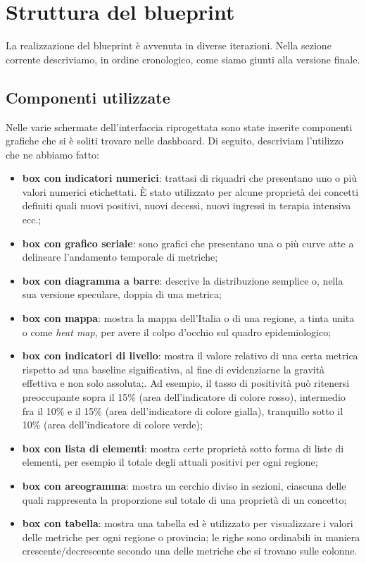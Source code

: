 \section{Struttura del blueprint}\label{s:struttura-blueprint}
La realizzazione del blueprint è avvenuta in diverse iterazioni. Nella sezione corrente descriviamo, in ordine cronologico, come siamo giunti alla versione finale.

\subsection{Componenti utilizzate}\label{ss:componenti-utilizzate}
Nelle varie schermate dell'interfaccia riprogettata sono state inserite componenti grafiche che si è soliti trovare nelle dashboard. Di seguito, descriviam l'utilizzo che ne abbiamo fatto:
\begin{itemize}
    \item \textbf{box con indicatori numerici}: trattasi di riquadri che presentano uno o più valori numerici etichettati. È stato utilizzato per alcune proprietà dei concetti definiti quali nuovi positivi, nuovi decessi, nuovi ingressi in terapia intensiva ecc.;
    \item \textbf{box con grafico seriale}: sono grafici che presentano una o più curve atte a delineare l'andamento temporale di metriche;
    \item \textbf{box con diagramma a barre}: descrive la distribuzione semplice o, nella sua versione speculare, doppia di una metrica;
    \item \textbf{box con mappa}: mostra la mappa dell'Italia o di una regione, a tinta unita o come \textit{heat map}, per avere il colpo d'occhio sul quadro epidemiologico;
    \item \textbf{box con indicatori di livello}: mostra il valore relativo di una certa metrica rispetto ad una baseline significativa, al fine di evidenziarne la gravità effettiva e non solo assoluta;. Ad esempio, il tasso di positività può ritenersi preoccupante sopra il 15\% (area dell'indicatore di colore rosso), intermedio fra il 10\% e il 15\% (area dell'indicatore di colore gialla), tranquillo sotto il 10\% (area dell'indicatore di colore verde);
    \item \textbf{box con lista di elementi}: mostra certe proprietà sotto forma di liste di elementi, per esempio il totale degli attuali positivi per ogni regione;
    \item \textbf{box con areogramma}: mostra un cerchio diviso in sezioni, ciascuna delle quali rappresenta la proporzione sul totale di una proprietà di un concetto;
    \item \textbf{box con tabella}: mostra una tabella ed è utilizzato per visualizzare i valori delle metriche per ogni regione o provincia; le righe sono ordinabili in maniera crescente/decrescente secondo una delle metriche che si trovano sulle colonne.
\end{itemize}

